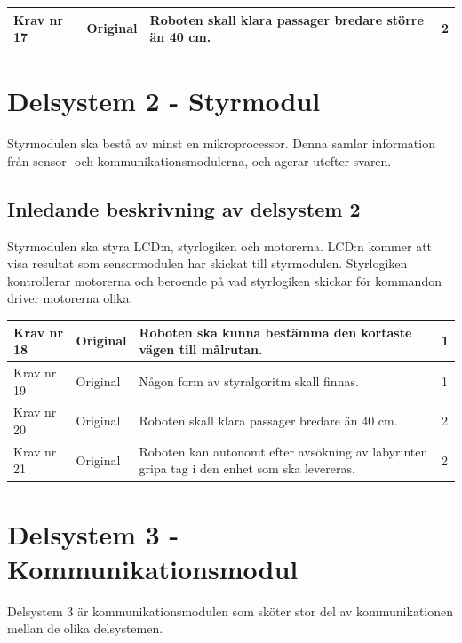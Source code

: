 \documentclass[11pt]{article}
\begin{document}
\begin{flushleft}
\begin{center}
\begin{longtable}{|l|l|p{.70\linewidth}|l|} \hline

Krav nr 17 &
Original &
Roboten skall klara passager bredare större än 40 cm. &
2 \\ \hline

\end{longtable}
\end{center}


\section{Delsystem 2 - Styrmodul}
Styrmodulen ska bestå av minst en mikroprocessor.  Denna samlar information från sensor- och kommunikationsmodulerna, och agerar utefter svaren.


\subsection{Inledande beskrivning av delsystem 2}
Styrmodulen ska styra LCD:n, styrlogiken och motorerna.
LCD:n kommer att visa resultat som sensormodulen har skickat till styrmodulen. Styrlogiken kontrollerar motorerna och beroende på vad styrlogiken skickar för kommandon driver motorerna olika.

\begin{center}
\begin{longtable}{|l|l|p{.70\linewidth}|l|} \hline

Krav nr 18 &
Original &
Roboten ska kunna bestämma den kortaste vägen till målrutan. &
1 \\ \hline

Krav nr 19 &
Original &
Någon form av styralgoritm skall finnas. &
1 \\ \hline

Krav nr 20 &
Original &
Roboten skall klara passager bredare än 40 cm. &
2 \\ \hline

Krav nr 21 &
Original &
Roboten kan autonomt efter avsökning av labyrinten gripa tag i den enhet som ska levereras. &
2 \\ \hline

\end{longtable}
\end{center}


\pagebreak

\section{Delsystem 3 - Kommunikationsmodul}
Delsystem 3 är kommunikationsmodulen som sköter stor del av kommunikationen mellan de olika delsystemen. 
\begin{center}
\begin{longtable}{|l|l|p{.70\linewidth}|l|} \hline


\end{longtable}
\end{center}
\end{flushleft}
\end{document}
